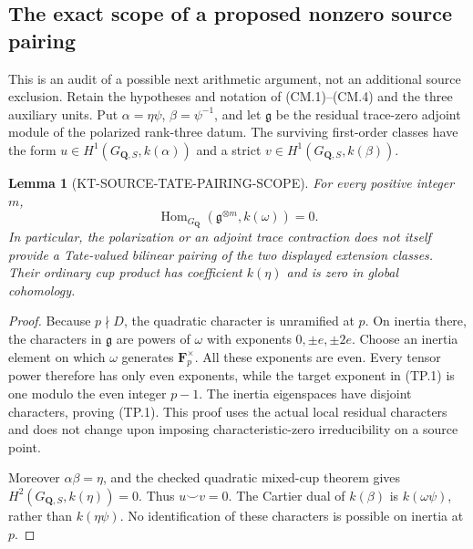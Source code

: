 \documentclass[11pt,a4paper]{article}
\newtheorem{lemma}[theorem]{Lemma}
\theoremstyle{definition}
\begin{document}


\subsection{The exact scope of a proposed nonzero source pairing}
\label{sec:kt-actual-source-pairing-audit}

This is an audit of a possible next arithmetic argument, not an
additional source exclusion.  Retain the hypotheses and notation
of (CM.1)--(CM.4) and the three auxiliary units.  Put
\(\alpha=\eta\psi\), \(\beta=\psi^{-1}\), and let
\(\mathfrak g\) be the residual trace-zero adjoint module of
the polarized rank-three datum.  The surviving first-order
classes have the form
\(u\in H^1(G_{\mathbf Q,S},k(\alpha))\) and a strict
\(v\in H^1(G_{\mathbf Q,S},k(\beta))\).

\begin{lemma}[KT-SOURCE-TATE-PAIRING-SCOPE]
For every positive integer \(m\),
\[
 \operatorname{Hom}_{G_{\mathbf Q}}
       (\mathfrak g^{\otimes m},k(\omega))=0.
 \tag{TP.1}
\]
In particular, the polarization or an adjoint trace contraction
does not itself provide a Tate-valued bilinear pairing of the
two displayed extension classes.  Their ordinary cup product
has coefficient \(k(\eta)\) and is zero in global cohomology.
\end{lemma}
\begin{proof}
Because \(p\nmid D\), the quadratic character is unramified
at \(p\).  On inertia there, the characters in
\(\mathfrak g\) are powers of \(\omega\) with exponents
\(0,\pm e,\pm2e\).  Choose an inertia element on which
\(\omega\) generates \(\mathbf F_p^\times\).
All these exponents are even.  Every tensor power therefore
has only even exponents, while the target exponent in (TP.1)
is one modulo the even integer \(p-1\).  The inertia
eigenspaces have disjoint characters, proving (TP.1).
This proof uses the actual local residual characters and
does not change upon imposing characteristic-zero
irreducibility on a source point.

Moreover \(\alpha\beta=\eta\), and the checked
quadratic mixed-cup theorem gives
\(H^2(G_{\mathbf Q,S},k(\eta))=0\).
Thus \(u\smile v=0\).  The Cartier dual of
\(k(\beta)\) is \(k(\omega\psi)\), rather than
\(k(\eta\psi)\).  No identification of these
characters is possible on inertia at \(p\).
\end{proof}
\end{document}
